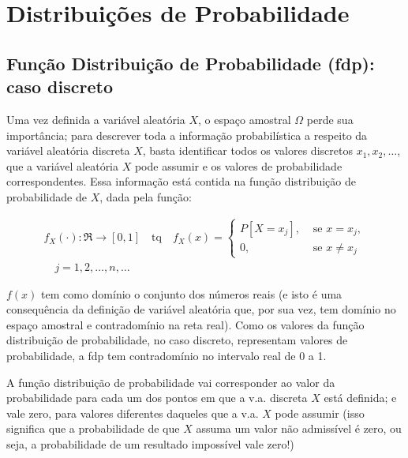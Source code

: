 \documentclass[
]{book}
\theoremstyle{definition}
\theoremstyle{definition}
\theoremstyle{definition}
\theoremstyle{remark}
\begin{document}
\hypertarget{distribuiuxe7uxf5es-de-probabilidade}{%
\section{Distribuições de Probabilidade}\label{distribuiuxe7uxf5es-de-probabilidade}}

\hypertarget{funuxe7uxe3o-distribuiuxe7uxe3o-de-probabilidade-fdp-caso-discreto}{%
\subsection*{Função Distribuição de Probabilidade (fdp): caso discreto}\label{funuxe7uxe3o-distribuiuxe7uxe3o-de-probabilidade-fdp-caso-discreto}}

Uma vez definida a variável aleatória \(X\), o espaço amostral \(\Omega\) perde sua importância; para descrever toda a informação probabilística a respeito da variável aleatória discreta \(X\), basta identificar todos os valores discretos \(x_1, x_2, \ldots\), que a variável aleatória \(X\) pode assumir e os valores de probabilidade correspondentes. Essa informação está contida na função distribuição de probabilidade de \(X\), dada pela função:

\begin{align*}
  f_X(\cdot): \Re \rightarrow [0,1] \quad \text{tq} \quad {f_X(x)} =
  \left\{
  \begin{array}{ll}
    P[X=x_j], & \text{ se } x = x_j, \\
    0, & \text{ se } x \neq x_j
  \end{array} 
  \right.
  \\
  \quad j = 1, 2, \ldots, n, \ldots
\end{align*}

\(f(x)\) tem como domínio o conjunto dos números reais (e isto é uma consequência da definição de variável aleatória que, por sua vez, tem domínio no espaço amostral e contradomínio na reta real). Como os valores da função distribuição de probabilidade, no caso discreto, representam valores de probabilidade, a fdp tem contradomínio no intervalo real de 0 a 1.

A função distribuição de probabilidade vai corresponder ao valor da probabilidade para cada um dos pontos em que a v.a. discreta \(X\) está definida; e vale zero, para valores diferentes daqueles que a v.a. \(X\) pode assumir (isso significa que a probabilidade de que \(X\) assuma um valor não admissível é zero, ou seja, a probabilidade de um resultado impossível vale zero!)
\end{document}
